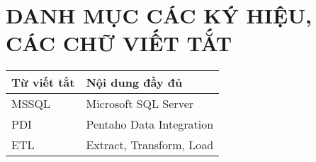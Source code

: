 
\pagebreak
{}
{}
\section*{\textbf{DANH MỤC CÁC KÝ HIỆU, CÁC CHỮ VIẾT TẮT}}

\begin{center}
\begin{tabular}{|p{3cm}|p{7cm}|}
\hline
\textbf{Từ viết tắt} & \textbf{Nội dung đầy đủ} \\
\hline
MSSQL & Microsoft SQL Server \\
\hline
PDI & Pentaho Data Integration \\
\hline
ETL & Extract, Transform, Load \\
\hline
\end{tabular}
\end{center}


\pagebreak
